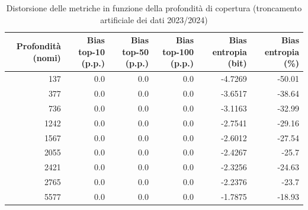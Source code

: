 \begin{table}[t]
\centering
\footnotesize
\caption{Distorsione delle metriche in funzione della profondità di copertura (troncamento artificiale dei dati 2023/2024)}
\label{tab:coverage_bias}
\begin{tabular}{r r r r r r}
\toprule
\textbf{Profondità (nomi)} & \textbf{Bias top-10 (p.p.)} & \textbf{Bias top-50 (p.p.)} & \textbf{Bias top-100 (p.p.)} & \textbf{Bias entropia (bit)} & \textbf{Bias entropia (\%)} \\
\midrule
137 & 0.0 & 0.0 & 0.0 & -4.7269 & -50.01 \\
377 & 0.0 & 0.0 & 0.0 & -3.6517 & -38.64 \\
736 & 0.0 & 0.0 & 0.0 & -3.1163 & -32.99 \\
1242 & 0.0 & 0.0 & 0.0 & -2.7541 & -29.16 \\
1567 & 0.0 & 0.0 & 0.0 & -2.6012 & -27.54 \\
2055 & 0.0 & 0.0 & 0.0 & -2.4267 & -25.7 \\
2421 & 0.0 & 0.0 & 0.0 & -2.3256 & -24.63 \\
2765 & 0.0 & 0.0 & 0.0 & -2.2376 & -23.7 \\
5577 & 0.0 & 0.0 & 0.0 & -1.7875 & -18.93 \\
\bottomrule
\end{tabular}
\end{table}
